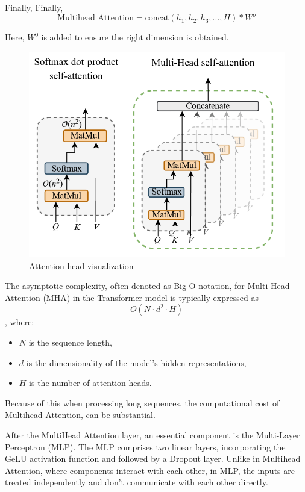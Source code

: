 \noindent Finally,
\noindent Finally,
\begin{equation}
    \text{Multihead Attention} = \text{concat} (h_1, h_2, h_3,...,H)* W^o
\end{equation}

\noindent Here, $W^0$ is added to ensure the right dimension is obtained.


\begin{figure}[htbp]
    \centering
    \includegraphics[width=5in]{img/Attentionfig.png}
    \caption{{Attention head visualization}}
\end{figure}

\noindent The asymptotic complexity, often denoted as Big O notation, for Multi-Head Attention (MHA) in the Transformer model is typically expressed as\[ O(N \cdot d^2 \cdot H)\], where:
\begin{itemize}
    \item $N$ is the sequence length,
    \item $d$ is the dimensionality of the model's hidden representations,
    \item $H$ is the number of attention heads.
\end{itemize}
\noindent Because of this when processing long sequences, the computational cost of Multihead Attention, can be substantial.

\noindent After the MultiHead Attention layer, an essential component is the Multi-Layer Perceptron (MLP). The MLP comprises two linear layers, incorporating the GeLU activation function and followed by a Dropout layer. Unlike in Multihead Attention, where components interact with each other, in MLP, the inputs are treated independently and don't communicate with each other directly.


